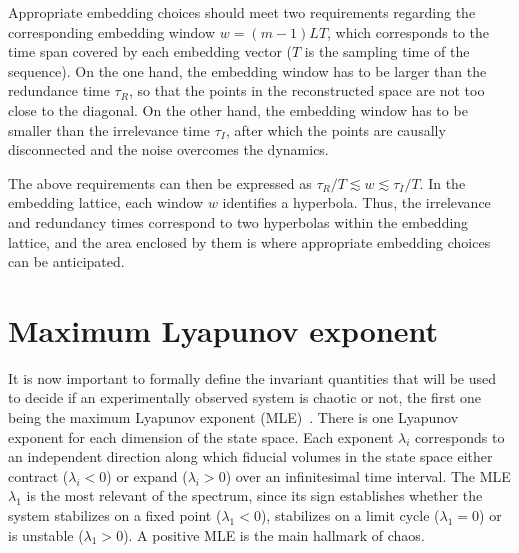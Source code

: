 Appropriate embedding choices should meet two requirements regarding the corresponding embedding window $w=(m-1)LT$, which corresponds to the
time span covered by each embedding vector ($T$ is the sampling time of the sequence).
On the one hand, the embedding window has to be larger than the redundance time $\tau_R$, so that
the points in the reconstructed space are not too close to the diagonal.
On the other hand, the embedding window has to be
smaller than the irrelevance time $\tau_I$, after which the points are causally disconnected
and the noise overcomes the dynamics.

The above requirements can then be expressed as $\tau_R/T \lesssim w \lesssim \tau_I/T$.
In the embedding lattice, each window $w$ identifies a hyperbola.
Thus, the irrelevance and redundancy times correspond to two hyperbolas within the embedding lattice, and the area enclosed by them is where appropriate embedding choices can be anticipated.


\section{Maximum Lyapunov exponent}\label{sec: mle}

It is now important to formally define the invariant
quantities that will be used to decide if an experimentally observed system is chaotic or not,
the first one being the maximum Lyapunov
exponent (MLE)~\cite{ref:abarbanel_fourier_spectra,wolf1986quantifying}.
There is one Lyapunov exponent for each dimension of the state space. Each exponent $\lambda_i$ corresponds to an independent direction along which fiducial volumes in the state space either contract ($\lambda_i < 0$) or expand ($\lambda_i > 0$) over an infinitesimal time interval.
The MLE $\lambda_1$ is the most relevant of the spectrum, since its sign establishes whether the system
stabilizes on a fixed point ($\lambda_1<0$), stabilizes on a limit cycle ($\lambda_1=0$) or is unstable
($\lambda_1>0$). A positive MLE is the main hallmark of chaos.

